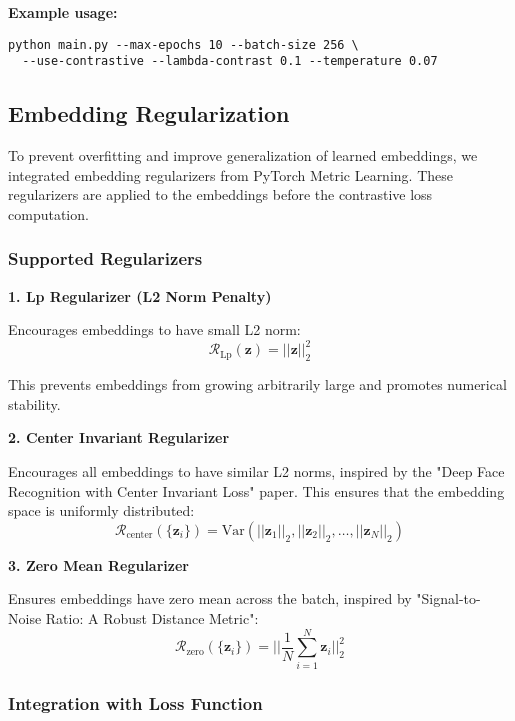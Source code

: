 \documentclass[12pt,a4paper]{article}
\begin{document}
\textbf{Example usage:}
\begin{verbatim}
python main.py --max-epochs 10 --batch-size 256 \
  --use-contrastive --lambda-contrast 0.1 --temperature 0.07
\end{verbatim}

\subsection{Embedding Regularization}

To prevent overfitting and improve generalization of learned embeddings, we integrated embedding regularizers from PyTorch Metric Learning. These regularizers are applied to the embeddings before the contrastive loss computation.

\subsubsection{Supported Regularizers}

\textbf{1. Lp Regularizer (L2 Norm Penalty)}

Encourages embeddings to have small L2 norm:
\begin{equation}
\mathcal{R}_{\text{Lp}}(\mathbf{z}) = ||\mathbf{z}||_2^2
\end{equation}

This prevents embeddings from growing arbitrarily large and promotes numerical stability.

\textbf{2. Center Invariant Regularizer}

Encourages all embeddings to have similar L2 norms, inspired by the "Deep Face Recognition with Center Invariant Loss" paper. This ensures that the embedding space is uniformly distributed:
\begin{equation}
\mathcal{R}_{\text{center}}(\{\mathbf{z}_i\}) = \text{Var}(||\mathbf{z}_1||_2, ||\mathbf{z}_2||_2, \ldots, ||\mathbf{z}_N||_2)
\end{equation}

\textbf{3. Zero Mean Regularizer}

Ensures embeddings have zero mean across the batch, inspired by "Signal-to-Noise Ratio: A Robust Distance Metric":
\begin{equation}
\mathcal{R}_{\text{zero}}(\{\mathbf{z}_i\}) = ||\frac{1}{N}\sum_{i=1}^N \mathbf{z}_i||_2^2
\end{equation}

\subsubsection{Integration with Loss Function}
\end{document}
